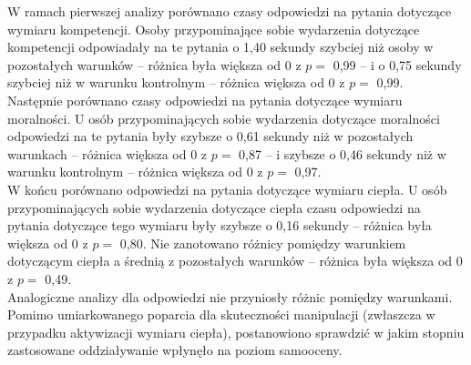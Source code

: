 \documentclass[man]{apa6}
\begin{document}
W ramach pierwszej analizy porównano czasy odpowiedzi na pytania dotyczące wymiaru kompetencji. Osoby przypominające sobie wydarzenia dotyczące kompetencji odpowiadały na te pytania o 1,40 sekundy szybciej niż osoby w pozostałych warunków -- różnica była większa od 0 z $p =$ 0,99 -- i o 0,75 sekundy szybciej niż w warunku kontrolnym -- różnica większa od 0 z $p =$ 0,99.\\

Następnie porównano czasy odpowiedzi na pytania dotyczące wymiaru moralności. U osób przypominających sobie wydarzenia dotyczące moralności odpowiedzi na te pytania były szybsze o 0,61 sekundy niż w pozostałych warunkach -- różnica większa od 0 z $p =$ 0,87 -- i szybsze o 0,46 sekundy niż w warunku kontrolnym -- różnica większa od 0 z $p =$ 0,97. \\

W końcu porównano odpowiedzi na pytania dotyczące wymiaru ciepła. U osób przypominających sobie wydarzenia dotyczące ciepła czasu odpowiedzi na pytania dotyczące tego wymiaru były szybsze o 0,16 sekundy -- różnica była większa od 0 z $p =$ 0,80. Nie zanotowano różnicy pomiędzy warunkiem dotyczącym ciepła a średnią z pozostałych warunków -- różnica była większa od 0 z $p =$ 0,49.\\
Analogiczne analizy dla odpowiedzi nie przyniosły różnic pomiędzy warunkami. Pomimo umiarkowanego poparcia dla skuteczności manipulacji (zwłaszcza w przypadku aktywizacji wymiaru ciepła), postanowiono sprawdzić w jakim stopniu zastosowane oddziaływanie wpłynęło na poziom samooceny.\\
\end{document}
